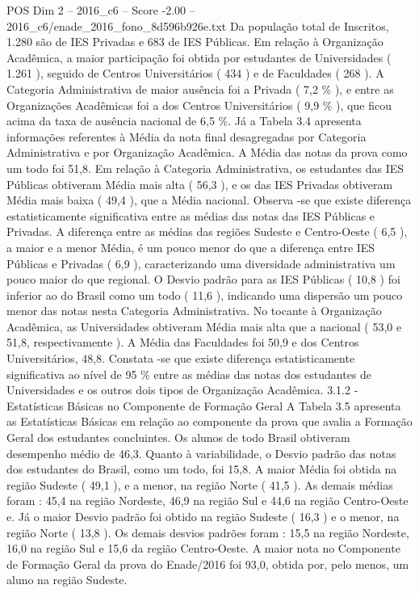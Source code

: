 \begin{textsample}{POS Dim 2 – 2016\_c6 – Score -2.00 – 2016\_c6/enade\_2016\_fono\_8d596b926e.txt}
Da população total de Inscritos, 1.280 são de IES Privadas e 683 de IES Públicas.
Em relação à Organização Acadêmica, a maior participação foi obtida por estudantes de Universidades ( 1.261 ), seguido de Centros Universitários ( 434 ) e de Faculdades ( 268 ).
A Categoria Administrativa de maior ausência foi a Privada ( 7,2 \% ), e entre as Organizações Acadêmicas foi a dos Centros Universitários ( 9,9 \% ), que ficou acima da taxa de ausência nacional de 6,5 \%.
Já a Tabela 3.4 apresenta informações referentes à Média da nota final desagregadas por Categoria Administrativa e por Organização Acadêmica.
A Média das notas da prova como um todo foi 51,8.
Em relação à Categoria Administrativa, os estudantes das IES Públicas obtiveram Média mais alta ( 56,3 ), e os das IES Privadas obtiveram Média mais baixa ( 49,4 ), que a Média nacional.
Observa -se que existe diferença estatisticamente significativa entre as médias das notas das IES Públicas e Privadas.
A diferença entre as médias das regiões Sudeste e Centro-Oeste ( 6,5 ), a maior e a menor Média, é um pouco menor do que a diferença entre IES Públicas e Privadas ( 6,9 ), caracterizando uma diversidade administrativa um pouco maior do que regional.
O Desvio padrão para as IES Públicas ( 10,8 ) foi inferior ao do Brasil como um todo ( 11,6 ), indicando uma dispersão um pouco menor das notas nesta Categoria Administrativa.
No tocante à Organização Acadêmica, as Universidades obtiveram Média mais alta que a nacional ( 53,0 e 51,8, respectivamente ).
A Média das Faculdades foi 50,9 e dos Centros Universitários, 48,8.
Constata -se que existe diferença estatisticamente significativa ao nível de 95 \% entre as médias das notas dos estudantes de Universidades e os outros dois tipos de Organização Acadêmica. 3.1.2 - Estatísticas Básicas no Componente de Formação Geral A Tabela 3.5 apresenta as Estatísticas Básicas em relação ao componente da prova que avalia a Formação Geral dos estudantes concluintes.
Os alunos de todo Brasil obtiveram desempenho médio de 46,3.
Quanto à variabilidade, o Desvio padrão das notas dos estudantes do Brasil, como um todo, foi 15,8.
A maior Média foi obtida na região Sudeste ( 49,1 ), e a menor, na região Norte ( 41,5 ).
As demais médias foram : 45,4 na região Nordeste, 46,9 na região Sul e 44,6 na região Centro-Oeste e.
Já o maior Desvio padrão foi obtido na região Sudeste ( 16,3 ) e o menor, na região Norte ( 13,8 ).
Os demais desvios padrões foram : 15,5 na região Nordeste, 16,0 na região Sul e 15,6 da região Centro-Oeste.
A maior nota no Componente de Formação Geral da prova do Enade/2016 foi 93,0, obtida por, pelo menos, um aluno na região Sudeste.

\end{textsample}
